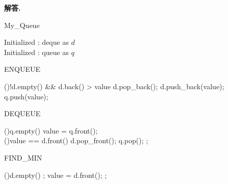 \documentclass[12pt, a4paper, oneside]{ctexart}
\newenvironment{solution}{\par\noindent\textbf{解答. }}{\par}
\begin{document}
\begin{solution}
    \begin{algorithm*}
        \caption{My\_Queue}
        \label{alg:algorithm}
        Initialized : deque as $d$\\
        Initialized : queue as $q$
    \end{algorithm*}
    \begin{algorithm*}
        \caption{ENQUEUE}
        \label{alg:algorithm}
        \While(){!d.empty() && d.back() > value}{
            d.pop\_back();
        }
        d.push\_back(value);\\
        q.push(value);
    \end{algorithm*}
    \begin{algorithm*}
        \caption{DEQUEUE}
        \label{alg:algorithm}
        \If(){q.empty()}{
        }
        value = q.front();\\
        \If(){value == d.front()}{
            d.pop\_front();
        }
        q.pop();
        \BlankLine
        ;
    \end{algorithm*}
    \begin{algorithm*}
        \caption{FIND\_MIN}
        \label{alg:algorithm}
        \If(){d.empty()}{
            ;
        }
        value = d.front();
        \BlankLine
        ;
    \end{algorithm*}

\end{solution}
\end{document}
